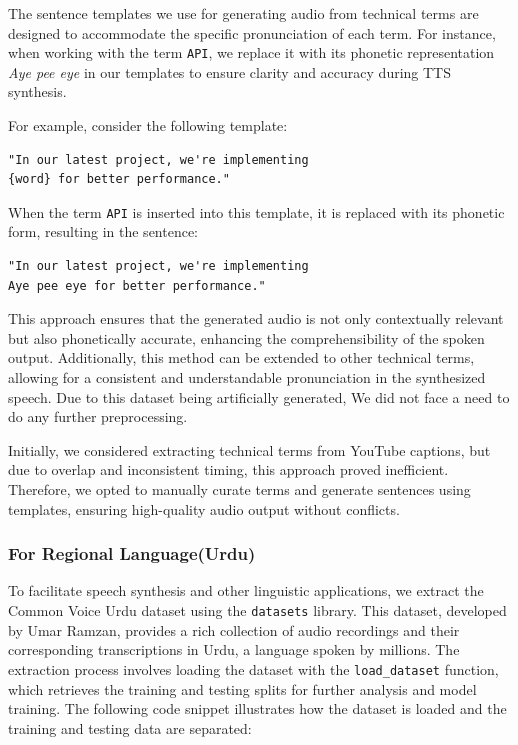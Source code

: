 \documentclass[conference]{IEEEtran}
\begin{document}
The sentence templates we use for generating audio from technical terms are designed to accommodate the specific pronunciation of each term. For instance, when working with the term \texttt{API}, we replace it with its phonetic representation \textit{Aye pee eye} in our templates to ensure clarity and accuracy during TTS synthesis. 

For example, consider the following template:

\begin{verbatim}
"In our latest project, we're implementing 
{word} for better performance."
\end{verbatim}

When the term \texttt{API} is inserted into this template, it is replaced with its phonetic form, resulting in the sentence:
\begin{verbatim}
"In our latest project, we're implementing 
Aye pee eye for better performance."
\end{verbatim}

This approach ensures that the generated audio is not only contextually relevant but also phonetically accurate, enhancing the comprehensibility of the spoken output. Additionally, this method can be extended to other technical terms, allowing for a consistent and understandable pronunciation in the synthesized speech. Due to this dataset being artificially generated, We did not face a need to do any further preprocessing.

Initially, we considered extracting technical terms from YouTube captions, but due to overlap and inconsistent timing, this approach proved inefficient. Therefore, we opted to manually curate terms and generate sentences using templates, ensuring high-quality audio output without conflicts.
\\
\subsubsection{For Regional Language(Urdu)}

To facilitate speech synthesis and other linguistic applications, we extract the Common Voice Urdu dataset using the \texttt{datasets} library. This dataset, developed by Umar Ramzan, provides a rich collection of audio recordings and their corresponding transcriptions in Urdu, a language spoken by millions. The extraction process involves loading the dataset with the \texttt{load\_dataset} function, which retrieves the training and testing splits for further analysis and model training. The following code snippet illustrates how the dataset is loaded and the training and testing data are separated:
\end{document}

